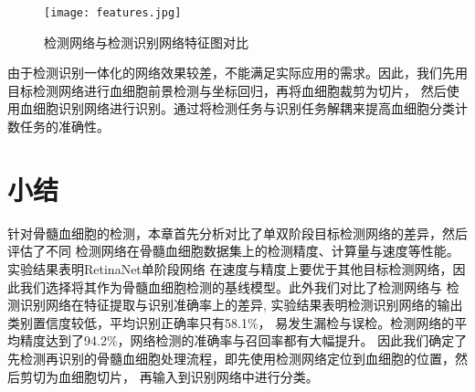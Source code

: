 \begin{figure}[htbp]                     
  \centering                      
  \texttt{[image: features.jpg]}                      
  \caption{检测网络与检测识别网络特征图对比}                      
  \label{fig:feature}       
\end{figure}   

 由于检测识别一体化的网络效果较差，不能满足实际应用的需求。因此，我们先用目标检测网络进行血细胞前景检测与坐标回归，再将血细胞裁剪为切片，
 然后使用血细胞识别网络进行识别。通过将检测任务与识别任务解耦来提高血细胞分类计数任务的准确性。

\section{小结}

针对骨髓血细胞的检测，本章首先分析对比了单双阶段目标检测网络的差异，然后评估了不同
检测网络在骨髓血细胞数据集上的检测精度、计算量与速度等性能。实验结果表明RetinaNet单阶段网络
在速度与精度上要优于其他目标检测网络，因此我们选择将其作为骨髓血细胞检测的基线模型。此外我们对比了检测网络与
检测识别网络在特征提取与识别准确率上的差异, 实验结果表明检测识别网络的输出类别置信度较低，平均识别正确率只有58.1\%，
易发生漏检与误检。检测网络的平均精度达到了94.2\%，网络检测的准确率与召回率都有大幅提升。
因此我们确定了先检测再识别的骨髓血细胞处理流程，即先使用检测网络定位到血细胞的位置，然后剪切为血细胞切片，
再输入到识别网络中进行分类。



